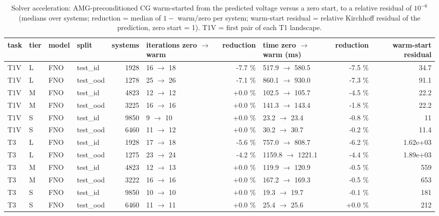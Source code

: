 \begin{table}[tb]
\centering
\scriptsize
\setlength{\tabcolsep}{3.5pt}
\caption{Solver acceleration: AMG-preconditioned CG warm-started from the predicted voltage versus a zero start, to a relative residual of $10^{-6}$ (medians over systems; reduction = median of $1 - $ warm/zero per system; warm-start residual = relative Kirchhoff residual of the prediction, zero start = 1). T1V = first pair of each T1 landscape.}
\label{tab:acceleration}
\setlength{\tabcolsep}{2.2pt}
\begin{tabular}{llllrlrlrr}
\toprule
task & tier & model & split & systems & iterations zero $\rightarrow$ warm & reduction & time zero $\rightarrow$ warm (ms) & reduction & warm-start residual \\
\midrule
T1V & L & FNO & test\_id & 1928 & 16 $\rightarrow$ 18 & -7.7 \% & 517.9 $\rightarrow$ 580.5 & -7.5 \% & 34.7 \\
T1V & L & FNO & test\_ood & 1278 & 25 $\rightarrow$ 26 & -7.1 \% & 860.1 $\rightarrow$ 930.0 & -7.3 \% & 91.1 \\
T1V & M & FNO & test\_id & 4823 & 12 $\rightarrow$ 12 & +0.0 \% & 102.5 $\rightarrow$ 105.7 & -4.5 \% & 22.2 \\
T1V & M & FNO & test\_ood & 3225 & 16 $\rightarrow$ 16 & +0.0 \% & 141.3 $\rightarrow$ 143.4 & -1.8 \% & 22.2 \\
T1V & S & FNO & test\_id & 9850 & 9 $\rightarrow$ 10 & +0.0 \% & 23.2 $\rightarrow$ 23.4 & -0.8 \% & 11 \\
T1V & S & FNO & test\_ood & 6460 & 11 $\rightarrow$ 12 & +0.0 \% & 30.2 $\rightarrow$ 30.7 & -0.2 \% & 11.4 \\
T3 & L & FNO & test\_id & 1928 & 17 $\rightarrow$ 18 & -5.6 \% & 757.0 $\rightarrow$ 808.7 & -6.2 \% & 1.62e+03 \\
T3 & L & FNO & test\_ood & 1275 & 23 $\rightarrow$ 24 & -4.2 \% & 1159.8 $\rightarrow$ 1221.1 & -4.4 \% & 1.89e+03 \\
T3 & M & FNO & test\_id & 4823 & 12 $\rightarrow$ 13 & +0.0 \% & 119.9 $\rightarrow$ 120.9 & -0.5 \% & 559 \\
T3 & M & FNO & test\_ood & 3222 & 16 $\rightarrow$ 16 & +0.0 \% & 167.2 $\rightarrow$ 169.3 & -0.5 \% & 653 \\
T3 & S & FNO & test\_id & 9850 & 10 $\rightarrow$ 10 & +0.0 \% & 19.3 $\rightarrow$ 19.7 & -0.1 \% & 181 \\
T3 & S & FNO & test\_ood & 6460 & 11 $\rightarrow$ 11 & +0.0 \% & 25.4 $\rightarrow$ 25.6 & +0.0 \% & 212 \\

\end{tabular}
\end{table}
